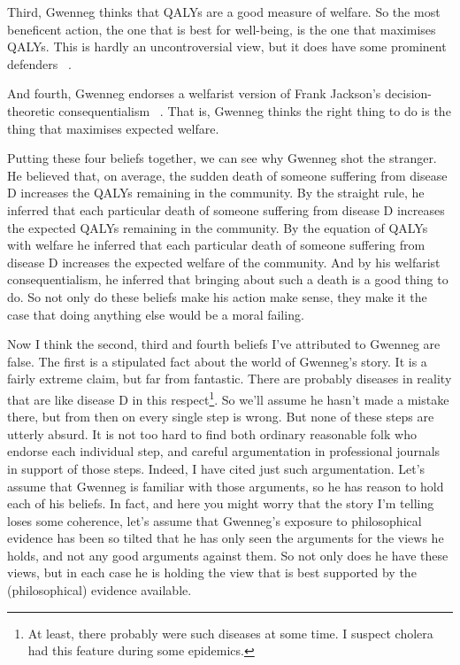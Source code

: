 Third, \gls{Gwenneg} thinks that QALYs are a good measure of welfare. So the most beneficent action, the one that is best for well-being, is the one that maximises QALYs. This is hardly an uncontroversial view, but it does have some prominent defenders ~\citep{McKie1998}.

And fourth, \gls{Gwenneg} endorses a welfarist version of \gls{Frank} Jackson's decision-theoretic consequentialism ~\citep{Jackson1991}. That is, \gls{Gwenneg} thinks the right thing to do is the thing that maximises expected welfare.

Putting these four beliefs together, we can see why \gls{Gwenneg} shot the stranger. He believed that, on average, the sudden death of someone suffering from disease D increases the QALYs remaining in the community. By the straight rule, he inferred that each particular death of someone suffering from disease D increases the expected QALYs remaining in the community. By the equation of QALYs with welfare he inferred that each particular death of someone suffering from disease D increases the expected welfare of the community. And by his welfarist consequentialism, he inferred that bringing about such a death is a good thing to do. So not only do these beliefs make his action make sense, they make it the case that doing anything else would be a moral failing.

Now I think the second, third and fourth beliefs I've attributed to \gls{Gwenneg} are false. The first is a stipulated fact about the world of \gls{Gwenneg}'s story. It is a fairly extreme claim, but far from fantastic. There are probably diseases in reality that are like disease D in this respect\footnote{At least, there probably were such diseases at some time. I suspect cholera had this feature during some epidemics.}. So we'll assume he hasn't made a mistake there, but from then on every single step is wrong. But none of these steps are utterly absurd. It is not too hard to find both ordinary reasonable folk who endorse each individual step, and careful argumentation in professional journals in support of those steps. Indeed, I have cited just such argumentation. Let's assume that \gls{Gwenneg} is familiar with those arguments, so he has reason to hold each of his beliefs. In fact, and here you might worry that the story I'm telling loses some coherence, let's assume that \gls{Gwenneg}'s exposure to philosophical evidence has been so tilted that he has only seen the arguments for the views he holds, and not any good arguments against them. So not only does he have these views, but in each case he is holding the view that is best supported by the (philosophical) evidence available.

